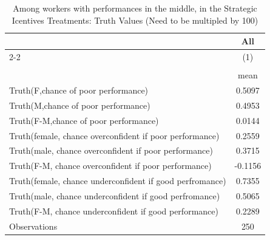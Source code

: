 \begin{table}[htbp]\centering
\def\sym#1{\ifmmode^{#1}\else\(^{#1}\)\fi}
\caption{Among workers with performances in the middle, in the Strategic Icentives Treatments: Truth Values (Need to be multipled by 100)}
\begin{tabular}{l*{1}{c}}
\hline\hline
                    &\multicolumn{1}{c}{All}\\\cmidrule(lr){2-2}
                    &\multicolumn{1}{c}{(1)}\\
                    &\multicolumn{1}{c}{}\\
                    &        mean\\
\hline
Truth(F,chance of poor performance)&      0.5097\\
Truth(M,chance of poor performance)&      0.4953\\
Truth(F-M,chance of poor performance)&      0.0144\\
Truth(female, chance overconfident if poor performance)&      0.2559\\
Truth(male, chance overconfident if poor performance)&      0.3715\\
Truth(F-M, chance overconfident if poor performance)&     -0.1156\\
Truth(female, chance underconfident if good perfromance)&      0.7355\\
Truth(male, chance underconfident if good perfromance)&      0.5065\\
Truth(F-M, chance underconfident if good performance)&      0.2289\\
\hline
Observations        &         250\\
\hline\hline
\end{tabular}
\end{table}
